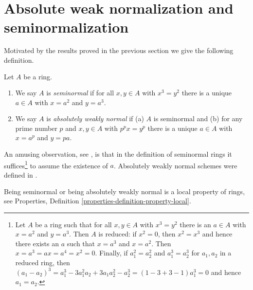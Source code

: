 \section{Absolute weak normalization and seminormalization}
\label{section-seminormalization}

\noindent
Motivated by the results proved in the previous section
we give the following definition.

\begin{definition}
\label{definition-seminormal-ring}
Let $A$ be a ring.
\begin{enumerate}
\item We say $A$ is {\it seminormal} if for all $x, y \in A$
with $x^3 = y^2$ there is a unique $a \in A$ with
$x = a^2$ and $y = a^3$.
\item We say $A$ is {\it absolutely weakly normal} if
(a) $A$ is seminormal and
(b) for any prime number $p$ and $x, y \in A$ with $p^px = y^p$
there is a unique $a \in A$ with $x = a^p$ and $y = pa$.
\end{enumerate}
\end{definition}

\noindent
An amusing observation, see \cite{Costa},
is that in the definition of seminormal rings it suffices\footnote{Let
$A$ be a ring such that for all $x, y \in A$ with $x^3 = y^2$ there is
an $a \in A$ with $x = a^2$ and $y = a^3$. Then $A$ is reduced: if
$x^2 = 0$, then $x^2 = x^3$ and hence there exists an $a$ such that
$x = a^3$ and $x = a^2$. Then $x = a^3 = ax = a^4 = x^2 = 0$. Finally,
if $a_1^2 = a_2^2$ and $a_1^3 = a_2^3$ for $a_1, a_2$ in a reduced ring,
then $(a_1 - a_2)^3 = a_1^3 - 3a_1^2a_2 +3a_1a_2^2 - a_2^3 =
(1 - 3 + 3 - 1)a_1^3 = 0$ and hence $a_1 = a_2$.} to assume the existence
of $a$. Absolutely weakly normal schemes were defined in
\cite[Appendix B]{rydh_descent}.

\begin{lemma}
\label{lemma-seminormal-local-property}
Being seminormal or being absolutely weakly normal
is a local property of rings, see
Properties, Definition \ref{properties-definition-property-local}.
\end{lemma}

